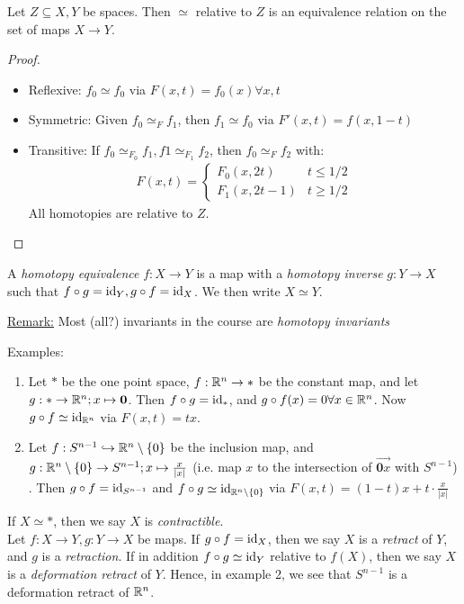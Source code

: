 \documentclass[10pt,a4paper]{article}
\begin{document}
\begin{lemma}
Let $Z\subseteq X, Y$ be spaces. Then $\simeq$ relative to $Z$ is an equivalence relation on the set of maps $X\rightarrow Y$.
\end{lemma}
\begin{proof}
\item
\begin{itemize}
\item{Reflexive: } $f_0 \simeq f_0$ via $F(x,t) = f_0(x) \forall x,t$
\item{Symmetric: } Given $f_0\simeq_F f_1$, then $f_1 \simeq f_0$ via $F'(x,t) = f(x, 1-t)$
\item{Transitive: } If $f_0 \simeq_{F_0} f_1, f1 \simeq_{F_1} f_2$, then $f_0 \simeq_F f_2$ with:
\begin{align*}
F(x,t) =
\begin{cases} 
F_0(x,2t) & t\leq 1/2 \\
F_1(x,2t-1) & t \geq 1/2
\end{cases}
\end{align*}
All homotopies are relative to $Z$.
\end{itemize}
\end{proof}
A \emph{homotopy equivalence} $f:X\rightarrow Y$ is a map with a \emph{homotopy inverse} $g:Y\rightarrow X$ such that $f\circ g = \operatorname{id}_Y, g\circ f = \operatorname{id}_X$. We then write $X \simeq Y$.

\underline{Remark:} Most (all?) invariants in the course are \emph{homotopy invariants}

Examples:
\begin{enumerate}
\item Let $\ast$ be the one point space, $f:\mathbb{R}^n \rightarrow \ast$ be the constant map, and let $g:\ast \rightarrow \mathbb{R}^n; x\mapsto \mathbf{0}$. Then $f\circ g = \operatorname{id}_{\ast}$, and $g\circ f (x) = 0 \forall x\in\mathbb{R}^n$. Now $g\circ f \simeq \operatorname{id}_{\mathbb{R}^n}$ via $F(x,t) = tx$.
\item Let $f:S^{n-1} \hookrightarrow \mathbb{R}^n\setminus\{0\}$ be the inclusion map, and $g:\mathbb{R}^n\setminus\{0\} \rightarrow S^{n-1}; x\mapsto \frac{x}{|x|}$ (i.e. map $x$ to the intersection of $\overrightarrow{\mathbf{0}x}$ with $S^{n-1}$) . Then $g\circ f =\operatorname{id}_{S^{n-1}}$ and $f\circ g \simeq \operatorname{id}_{\mathbb{R}^n\setminus\{0\}}$ via $F(x,t) = (1-t)x + t\cdot\frac{x}{|x|}$
\end{enumerate}

If $X\simeq \ast$, then we say $X$ is \emph{contractible}.\\
Let $f:X\rightarrow Y, g:Y\rightarrow X$ be maps. If $g\circ f=\operatorname{id}_X$, then we say $X$ is a \emph{retract} of $Y$, and $g$ is a \emph{retraction}. If in addition $f\circ g\simeq \operatorname{id}_Y$ relative to $f(X)$, then we say $X$ is a \emph{deformation retract} of $Y$. Hence, in example 2, we see that $S^{n-1}$ is a deformation retract of $\mathbb{R}^n$.
\end{document}
